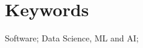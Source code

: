 \documentclass[11pt]{article}
\begin{document}
\section{Keywords}
Software; Data Science, ML and AI;





\end{document}
